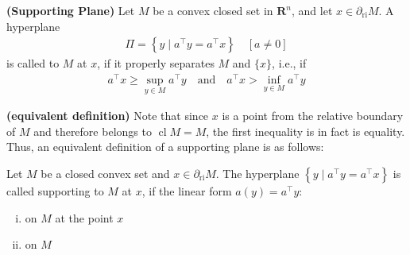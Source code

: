 \documentclass{article}
\newcommand{\bfs}[1]{\textbf{({#1}) }}
\newcommand{\cl}{\operatorname{cl}}
\begin{document}
\begin{defa}{\bfs{Supporting Plane}}\label{def:supp_p}
  Let $M$ be a convex closed set in $\mathbf{R}^{n}$, and let $x\in \partial_{\mathrm{ri}} M$. A hyperplane
\begin{align*}
\Pi=\left\{y \mid a^{\top} y=a^{\top} x\right\} \quad[a \neq 0]
\end{align*}
is called  to $M$ at $x$, if it properly separates $M$ and $\{x\}$, i.e., if
\begin{align*}
a^{\top} x \geq \sup _{y \in M} a^{\top} y\quad \text{and} \quad a^{\top} x>\inf _{y \in M} a^{\top} y
\end{align*}
\end{defa}
\begin{rema}{\bfs{equivalent definition}}
Note that since $x$ is a point from the relative boundary of $M$ and therefore belongs to $\cl M=M$, the first inequality is in fact is equality. Thus, an equivalent definition of a supporting plane is as follows:

Let $M$ be a closed convex set and $x\in \partial_{\mathrm{ri}} M$. The hyperplane $\left\{y \mid a^{\top} y=a^{\top} x\right\}$ is called supporting to $M$ at $x$, if the linear form $a(y)=a^{\top} y$:
\begin{enumerate}[i).]
    \item {} on $M$ at the point $x$ 
    \item {} on $M$
\end{enumerate}
\end{rema}
\end{document}
